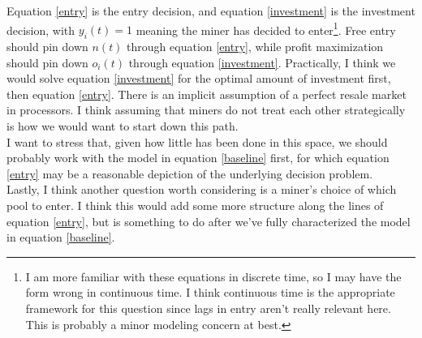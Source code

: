 \documentclass[12pt]{article}
\begin{document}
Equation \ref{entry} is the entry decision, and equation \ref{investment} is the investment decision, with $y_i(t)=1$ meaning the miner has decided to enter\footnote{I am more familiar with these equations in discrete time, so I may have the form wrong in continuous time. I think continuous time is the appropriate framework for this question since lags in entry aren't really relevant here. This is probably a minor modeling concern at best.}. Free entry should pin down $n(t)$ through equation \ref{entry}, while profit maximization should pin down $o_i(t)$ through equation \ref{investment}. Practically, I think we would solve equation \ref{investment} for the optimal amount of investment first, then equation \ref{entry}. There is an implicit assumption of a perfect resale market in processors. I think assuming that miners do not treat each other strategically is how we would want to start down this path. \\

I want to stress that, given how little has been done in this space, we should probably work with the model in equation \ref{baseline} first, for which equation \ref{entry} may be a reasonable depiction of the underlying decision problem. \\

Lastly, I think another question worth considering is a miner's choice of which pool to enter. I think this would add some more structure along the lines of equation \ref{entry}, but is something to do after we've fully characterized the model in equation \ref{baseline}.
\end{document}
